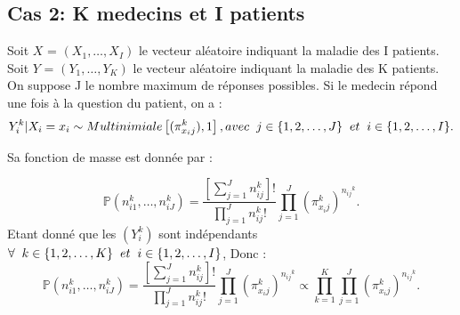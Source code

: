 \documentclass[a4paper,french,10pt]{article}
\begin{document}
	\subsection{Cas 2: K medecins et I patients}
	
	Soit $X$ = $(X_1, \dots, X_I)$ le vecteur aléatoire indiquant la maladie des I patients.\\
	Soit $Y$ = $(Y_1, \dots, Y_K)$ le vecteur aléatoire indiquant la maladie des K patients.\\
	On suppose J le nombre maximum de réponses possibles. Si le medecin répond une fois à la question du patient, on a : 	\[Y_{i}^k | X_i=x_i \sim Multinimiale \left[(\pi_{x_ij}^k), 1\right], avec\hspace{2mm}j \in \{1, 2, \dots,J\}\hspace{2mm} et\hspace{2mm} i \in \{1, 2, \dots,I\} .\]
	
	
	Sa fonction de masse est donnée par :
	
	\[\mathbb{P}\left(n_{i1}^k, \dots, n_{iJ}^k\right) = \frac{\left[\sum_{j=1}^{J} n_{ij}^k\right]!}{\prod_{j=1}^{J} n_{ij}^k !} \prod_{j=1}^{J} \left(\pi_{x_ij}^k\right)^{{n_{ij}}^{k}} .\]
	Etant donné que les $(Y_{i}^k)$ sont indépendants $ \forall\hspace{2mm}k \in \{1, 2, \dots,K\}\hspace{2mm} et\hspace{2mm} i \in \{1, 2, \dots,I\}$, Donc : \[\mathbb{P}\left(n_{i1}^k, \dots, n_{iJ}^k\right) = \frac{\left[\sum_{j=1}^{J} n_{ij}^k\right]!}{\prod_{j=1}^{J} n_{ij}^k !} \prod_{j=1}^{J} \left(\pi_{x_ij}^k\right)^{{n_{ij}}^{k}} \propto \prod_{k=1}^{K} \prod_{j=1}^{J} \left(\pi_{x_ij}^k\right)^{{n_{ij}}^{k}}.\]
	
\end{document}
